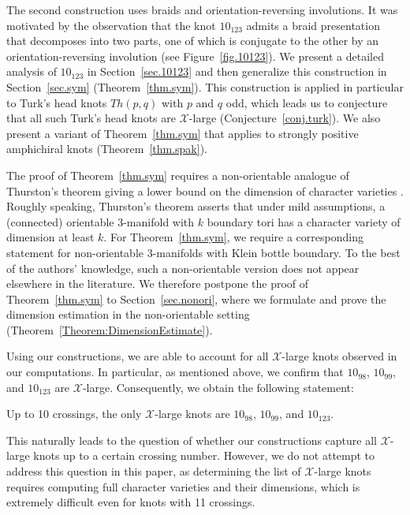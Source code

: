 \documentclass[12pt,reqno]{amsart}
\theoremstyle{definition}
\def\calX{\mathcal X}
\begin{document}
The second construction uses braids and orientation-reversing involutions. It was motivated by the observation that the knot $10_{123}$ admits a braid presentation that decomposes into two parts, one of which is conjugate to the other by an orientation-reversing involution (see Figure~\ref{fig.10123}). We present a detailed analysis of $10_{123}$ in Section~\ref{sec.10123} and then generalize this construction in  Section~\ref{sec.sym} (Theorem~\ref{thm.sym}). This construction is applied in particular to Turk's head knots $Th(p,q)$ with $p$ and $q$ odd, which leads us to conjecture that all such Turk's head knots are $\calX$-large (Conjecture~\ref{conj.turk}).
We also present a variant of Theorem~\ref{thm.sym} that applies to strongly positive amphichiral knots (Theorem~\ref{thm.spak}).

The proof of Theorem~\ref{thm.sym} requires a non-orientable analogue of Thurston's theorem giving a lower bound on the dimension of character varieties \cite[Theorem 5.6]{ThurstonNotes}. Roughly speaking, Thurston's theorem asserts that under mild assumptions,  a (connected) orientable 3-manifold with $k$ boundary tori has a character variety of dimension at least $k$. For Theorem~\ref{thm.sym}, we require a corresponding statement for non-orientable 3-manifolds with Klein bottle boundary.
To the best of the authors’ knowledge, such a non-orientable version does not appear elsewhere in the literature. We therefore postpone the proof of Theorem~\ref{thm.sym} to Section~\ref{sec.nonori}, where we formulate and prove the dimension estimation in the non-orientable setting (Theorem~\ref{Theorem:DimensionEstimate}).

Using our constructions, we are able to account for all $\mathcal{X}$-large knots observed in our computations. In particular, as mentioned above, we confirm that $10_{98}$, $10_{99}$, and $10_{123}$ are $\calX$-large. Consequently, we obtain the following statement:
\begin{center}
Up to 10 crossings, the only $\mathcal{X}$-large knots are $10_{98}$, $10_{99}$, and $10_{123}$.
\end{center}
This naturally leads to the question of whether our constructions capture all $\mathcal{X}$-large knots up to a certain crossing number. However, we do not attempt to address this question in this paper, as determining the list of $\mathcal{X}$-large knots requires computing full character varieties and their dimensions, which is extremely difficult even for knots with 11 crossings.
\end{document}
